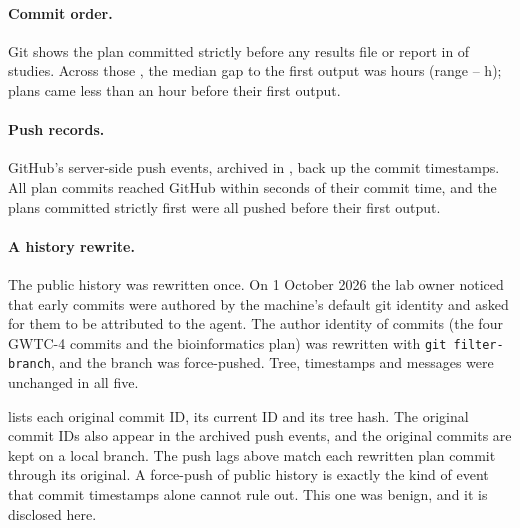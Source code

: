 \paragraph{Commit order.} Git shows the plan committed strictly before any results file or report in
\PreregPassStrict{} of \StudiesTotal{} studies. Across those \PreregPassN{}, the median gap to the first output was
\PreregMedianHours{} hours (range \PreregMinHours{}--\PreregMaxHours{} h); \PreregUnderHour{} plans came less than an
hour before their first output.

\paragraph{Push records.} GitHub's server-side push events, archived in , back up the commit timestamps.
All \PushUnderMinute{} plan commits reached GitHub within \PushMaxLagSec{} seconds of their commit time, and the
\PushStrictN{} plans committed strictly first were all pushed before their first output.

\paragraph{A history rewrite.} The public history was rewritten once. On 1 October 2026 the lab owner noticed that
early commits were authored by the machine's default git identity and asked for them to be attributed to the agent.
The author identity of \RewrittenCommits{} commits (the four GWTC-4 commits and the bioinformatics plan) was rewritten
with \texttt{git filter-branch}, and the branch was force-pushed. Tree, timestamps and messages were unchanged in all
five.

 lists each original commit ID, its current ID and its tree hash. The original commit
IDs also appear in the archived push events, and the original commits are kept on a local branch. The push lags above
match each rewritten plan commit through its original. A force-push of public history is exactly the kind of event
that commit timestamps alone cannot rule out. This one was benign, and it is disclosed here.

